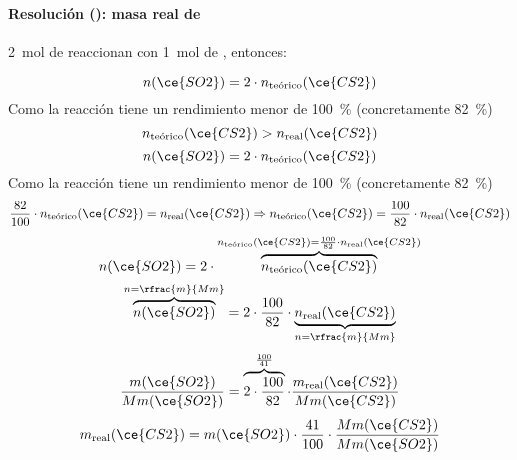 \begin{frame}
	\frametitle{\ejerciciocmd}
	\framesubtitle{Resolución (): masa real de }
	 
	 \SI{2}{\mol} de  reaccionan con \SI{1}{\mol} de , entonces:
	\begin{overprint}
			$$
				n(\ce{SO2}) = 2\cdot n_{\text{teórico}}(\ce{CS2})
			$$
			Como la reacción tiene un rendimiento menor de \SI{100}{\percent} (concretamente \SI{82}{\percent})
			$$
				n_{\text{teórico}}(\ce{CS2}) > n_{\text{real}}(\ce{CS2})
			$$
		\onslide<2>
			$$
				n(\ce{SO2}) = 2\cdot n_{\text{teórico}}(\ce{CS2})
			$$
			Como la reacción tiene un rendimiento menor de \SI{100}{\percent} (concretamente \SI{82}{\percent})
			$$
				\frac{82}{100}\cdot n_{\text{teórico}}(\ce{CS2}) = n_{\text{real}}(\ce{CS2})\Rightarrow	n_{\text{teórico}}(\ce{CS2}) = \frac{100}{82}\cdot n_{\text{real}}(\ce{CS2})
			$$
		\onslide<3>
			$$
				n(\ce{SO2}) = 2\cdot\overbrace{n_{\text{teórico}}(\ce{CS2})}^{n_{\text{teórico}}(\ce{CS2}) = \frac{100}{82}\cdot n_{\text{real}}(\ce{CS2})}
			$$
		\onslide<4>
			$$
				\overbrace{n(\ce{SO2})}^{n=\rfrac{m}{Mm}} = 2\cdot\frac{100}{82}\cdot\underbrace{n_{\text{real}}(\ce{CS2})}_{n=\rfrac{m}{Mm}}
			$$
		\onslide<5>
			$$
				\frac{m(\ce{SO2})}{Mm(\ce{SO2})} = \overbrace{2\cdot\frac{100}{82}}^{\frac{100}{41}}\cdot\frac{m_{\text{real}}(\ce{CS2})}{Mm(\ce{CS2})}
			$$
		\onslide<6->
			$$
				m_{\text{real}}(\ce{CS2}) = m(\ce{SO2})\cdot\frac{41}{100}\cdot\frac{Mm(\ce{CS2})}{Mm(\ce{SO2})}
			$$
	\end{overprint}
\end{frame}
